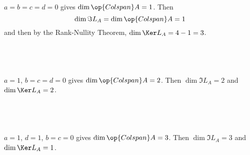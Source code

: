 \documentclass[a4paper]{article}
\begin{document}
$a = b = c = d = 0$ gives $\dim \op{Colspan} A = 1$. Then $$\dim \Im L_A = \dim \op{Colspan} A = 1$$
and then by the Rank-Nullity Theorem, $\dim \Ker L_A = 4 - 1 = 3$.

\subsection{~}

$a = 1$, $b = c = d = 0$ gives $\dim \op{Colspan} A = 2$. Then $\dim \Im L_A = 2$ and $\dim \Ker L_A = 2$.

\subsection{~}

$a = 1$, $d = 1$, $b = c = 0$ gives $\dim \op{Colspan} A = 3$. Then $\dim \Im L_A = 3$ and $\dim \Ker L_A = 1$.

\end{document}
